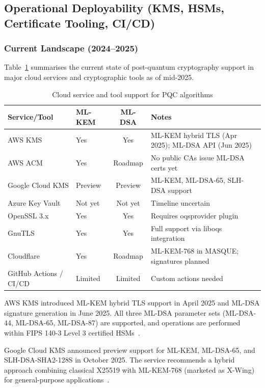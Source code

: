 \documentclass[12pt,a4paper]{article}
\begin{document}
\subsection{Operational Deployability (KMS, HSMs, Certificate Tooling, CI/CD)}

\subsubsection{Current Landscape (2024–2025)}

Table~\ref{tab:service-support} summarises the current state of post-quantum cryptography support in major cloud services and cryptographic tools as of mid-2025.

\begin{table}[htbp]
\centering
\caption{Cloud service and tool support for PQC algorithms}
\label{tab:service-support}
\begin{tabular}{llcp{5cm}}
\toprule
\textbf{Service/Tool} & \textbf{ML-KEM} & \textbf{ML-DSA} & \textbf{Notes} \\
\midrule
AWS KMS & Yes & Yes & ML-KEM hybrid TLS (Apr 2025); ML-DSA API (Jun 2025) \\
AWS ACM & Yes & Roadmap & No public CAs issue ML-DSA certs yet \\
Google Cloud KMS & Preview & Preview & ML-KEM, ML-DSA-65, SLH-DSA support \\
Azure Key Vault & Not yet & Not yet & Timeline uncertain \\
OpenSSL 3.x & Yes & Yes & Requires oqsprovider plugin \\
GnuTLS & Yes & Yes & Full support via liboqs integration \\
Cloudflare & Yes & Roadmap & ML-KEM-768 in MASQUE; signatures planned \\
GitHub Actions / CI/CD & Limited & Limited & Custom actions needed \\
\bottomrule
\end{tabular}
\end{table}

AWS KMS introduced ML-KEM hybrid TLS support in April 2025 and ML-DSA signature generation in June 2025. All three ML-DSA parameter sets (ML-DSA-44, ML-DSA-65, ML-DSA-87) are supported, and operations are performed within FIPS 140-3 Level 3 certified HSMs~\cite{aws-kms-mldsa-2025,aws-mlkem-deployment-2025}.

Google Cloud KMS announced preview support for ML-KEM, ML-DSA-65, and SLH-DSA-SHA2-128S in October 2025. The service recommends a hybrid approach combining classical X25519 with ML-KEM-768 (marketed as X-Wing) for general-purpose applications~\cite{google-cloud-kms-pqc-2025}.
\end{document}
